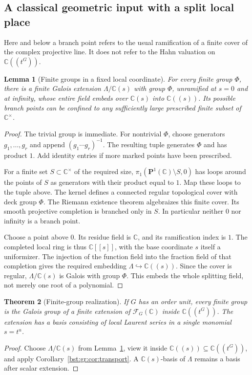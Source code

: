 \documentclass[11pt,letterpaper]{article}
\newtheorem{theorem}{Theorem}[section]
\newtheorem{lemma}[theorem]{Lemma}
\theoremstyle{definition}
\theoremstyle{remark}
\newcommand{\C}{\mathbb C}
\newcommand{\HH}[2]{#1((t^{#2}))}
\newcommand{\FF}[2]{\mathcal F_{#2}(#1)}
\begin{document}
\subsection{A classical geometric input with a split local place}

Here and below a branch point refers to the usual ramification of a finite
cover of the complex projective line. It does not refer to the Hahn
valuation on $\HH{\C}G$.

\begin{lemma}[Finite groups in a fixed local coordinate]\label{bst:gr:lem:ret}
For every finite group $\Phi$, there is a finite Galois extension
$\Lambda/\C(s)$ with group $\Phi$, unramified at $s=0$ and at infinity, whose
entire field embeds over $\C(s)$ into $\C((s))$. Its possible branch points
can be confined to any sufficiently large prescribed finite subset of
$\C^\times$.
\end{lemma}
\begin{proof}
The trivial group is immediate. For nontrivial $\Phi$, choose generators
$g_1,\ldots,g_r$ and append $(g_1\cdots g_r)^{-1}$. The resulting tuple
generates $\Phi$ and has product $1$. Add identity entries if more marked
points have been prescribed.

For a finite set $S\subset\C^\times$ of the required size,
$\pi_1(\mathbf P^1(\C)\setminus S,0)$ has loops around the points of $S$
as generators with their product equal to $1$. Map these loops to the tuple
above. The kernel defines a connected regular topological cover with deck
group $\Phi$. The Riemann existence theorem \cite[Theorem~21.3]{MilneEC}
algebraizes this finite cover. Its smooth projective completion is branched
only in $S$. In particular neither $0$ nor infinity is a branch point.

Choose a point above $0$. Its residue field is $\C$, and its ramification
index is $1$. The completed local ring is thus $\C[[s]]$, with the base
coordinate $s$ itself a uniformizer. The injection of the function field
into the fraction field of that completion gives the required embedding
$\Lambda\hookrightarrow\C((s))$. Since the cover is regular, $\Lambda/\C(s)$
is Galois with group $\Phi$. This embeds the whole splitting field, not
merely one root of a polynomial.
\end{proof}

\begin{theorem}[Finite-group realization]\label{bst:gr:thm:finitegroups}
If $G$ has an order unit, every finite group is the Galois group of a finite
extension of $\FF{\C}G$ inside $\HH{\C}G$. The extension has a basis
consisting of local Laurent series in a single monomial $s=t^u$.
\end{theorem}
\begin{proof}
Choose $\Lambda/\C(s)$ from Lemma~\ref{bst:gr:lem:ret}, view it inside
$\C((s))\subseteq\HH{\C}G$, and apply Corollary~\ref{bst:gr:cor:transport}.
A $\C(s)$-basis of $\Lambda$ remains a basis after scalar extension.
\end{proof}
\end{document}
